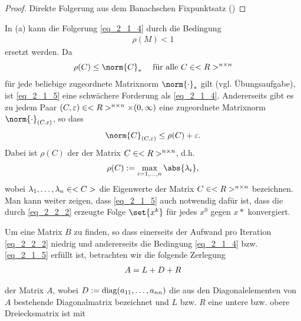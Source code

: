 \begin{proof}
	Direkte Folgerung aus dem Banachschen Fixpunktsatz ()
\end{proof}


\begin{remark}
	In  (a) kann die Folgerung \cref{eq_2_1_4} durch die Bedingung
	\begin{align}
	\rho(M) < 1\label{eq_2_1_5}
	\end{align}
	ersetzt werden. Da
	\begin{align}
		\rho(C) \le \norm{C}_{\ast} \quad \text{ für alle } C \in \Rnn \notag
	\end{align}
	für jede beliebige zugeordnete Matrixnorm $\norm{\cdot}_{\ast}$ gilt (vgl. Übungsaufgabe), ist \cref{eq_2_1_5} eine schwächere Forderung als \cref{eq_2_1_4}. Andererseits gibt es zu jedem Paar $(C,\varepsilon) \in <R>^{n \times n} \times (0,\infty)$ eine zugeordnete Matrixnorm $\norm{\cdot}_{(C,\epsilon)}$, so dass
	\begin{align}
		\norm{C}_{(C,\epsilon)} \le \rho(C) + \epsilon. \notag
	\end{align}
	Dabei ist $\rho(C)$ der  der Matrix $C \in <R>^{n \times n}$, d.h.
	\begin{align}
		\rho(C) := \max_{i = 1,\dots,n}\abs{\lambda_i}, \notag
	\end{align}
	wobei $\lambda_1,\dots,\lambda_n \in <C>$ die Eigenwerte der Matrix $C \in <R>^{n \times n}$ bezeichnen. Man kann weiter zeigen, dass \cref{eq_2_1_5} auch notwendig dafür ist, dass die durch \cref{eq_2_2_2} erzeugte Folge $\set{x^k}$ für jedes $x^0$ gegen $x*$ konvergiert.
\end{remark}

Um eine Matrix $B$ zu finden, so dass einerseits der Aufwand pro Iteration \cref{eq_2_2_2} niedrig und andererseits die Bedingung \cref{eq_2_1_4} bzw. \cref{eq_2_1_5} erfüllt ist, betrachten wir die folgende Zerlegung
\begin{align}
	A = L + D + R \notag
\end{align}

der Matrix $A$, wobei $D:= \operatorname{diag}(a_{11}, \dots, a_{nn})$ die aus den Diagonalelementen von $A$ bestehende Diagonalmatrix bezeichnet und $L$ bzw. $R$ eine untere bzw. obere Dreiecksmatrix ist mit

